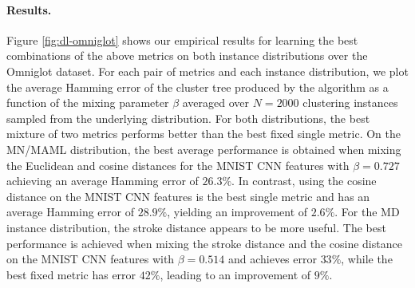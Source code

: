 \paragraph{Results.} Figure \ref{fig:dl-omniglot} shows our empirical results for
learning the best combinations of the above metrics on both instance
distributions over the Omniglot dataset. For each pair of metrics and each
instance distribution, we plot the average Hamming error of the cluster tree
produced by the algorithm as a function of the mixing parameter $\beta$ averaged
over $N = 2000$ clustering instances sampled from the underlying distribution.
For both distributions, the best mixture of two metrics performs better than the
best fixed single metric. On the MN/MAML distribution, the best average
performance is obtained when mixing the Euclidean and cosine distances for the
MNIST CNN features with $\beta = 0.727$ achieving an average Hamming error of
$26.3\%$. In contrast, using the cosine distance on the MNIST CNN features is the
best single metric and has an average Hamming error of $28.9\%$, yielding an
improvement of $2.6\%$. For the MD instance distribution, the stroke distance
appears to be more useful. The best performance is achieved when mixing the
stroke distance and the cosine distance on the MNIST CNN features with $\beta =
0.514$ and achieves error $33\%$, while the best fixed metric has error $42\%$,
leading to an improvement of $9\%$.


